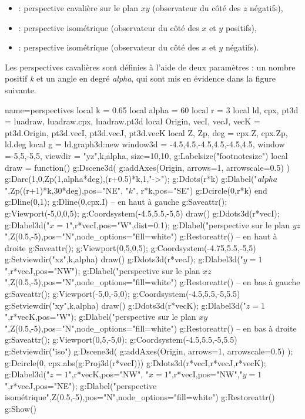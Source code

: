 \begin{itemize}
\begin{itemize}
            \item {} : perspective cavalière sur le plan $xy$ (observateur du côté des $z$ négatifs),
            \item {} : perspective isométrique (observateur du côté des $x$ et $y$ positifs),
            \item {} : perspective isométrique (observateur du côté des $x$ et $y$ négatifs).
        \end{itemize}
        Les perspectives cavalières sont définies à l'aide de deux paramètres : un nombre positif \emph{k} et un angle en degré \emph{alpha}, qui sont mis en évidence dans la figure suivante.
\end{itemize}

\begin{center}
\begin{luadraw}{name=perspectives}
local k = 0.65
local alpha = 60
local r = 3
local ld, cpx, pt3d = luadraw, luadraw.cpx, luadraw.pt3d
local Origin, vecI, vecJ, vecK = pt3d.Origin, pt3d.vecI, pt3d.vecJ, pt3d.vecK 
local Z, Zp, deg = cpx.Z, cpx.Zp, ld.deg
local g = ld.graph3d:new{
    window3d = {-4.5,4.5,-4.5,4.5,-4.5,4.5},
    window ={-5,5,-5,5},
    viewdir = {"yz",k,alpha},
    size={10,10},
}
g:Labelsize("footnotesize")
local draw = function()
    g:Dscene3d( g:addAxes(Origin, {arrows=1, arrowscale=0.5}) )
    g:Darc(1,0,Zp(1,alpha*deg),(r+0.5)*k,1,"->"); g:Ddots(r*k)
    g:Dlabel("$\\alpha$",Zp((r+1)*k,30*deg),{pos="NE"}, "$k$", r*k,{pos="SE"})
    g:Dcircle(0,r*k)
end
g:Dline(0,1); g:Dline(0,cpx.I)
-- en haut à gauche
g:Saveattr(); g:Viewport(-5,0,0,5); g:Coordsystem(-4.5,5.5,-5,5)
draw()
g:Ddots3d(r*vecI); g:Dlabel3d("$x=1$",r*vecI,{pos="W",dist=0.1}); 
g:Dlabel("perspective sur le plan $yz$",Z(0.5,-5),{pos="N",node_options="fill=white"})
g:Restoreattr()
-- en haut à droite
g:Saveattr(); g:Viewport(0,5,0,5); g:Coordsystem(-4.75,5.5,-5,5)
g:Setviewdir({"xz",k,alpha})
draw()
g:Ddots3d(r*vecJ); g:Dlabel3d("$y=1$",r*vecJ,{pos="NW"}); 
g:Dlabel("perspective sur le plan $xz$",Z(0.5,-5),{pos="N",node_options="fill=white"})
g:Restoreattr()
-- en bas à gauche
g:Saveattr(); g:Viewport(-5,0,-5,0); g:Coordsystem(-4.5,5.5,-5,5.5)
g:Setviewdir({"xy",k,alpha})
draw()
g:Ddots3d(r*vecK); g:Dlabel3d("$z=1$",r*vecK,{pos="W"}); 
g:Dlabel("perspective sur le plan $xy$",Z(0.5,-5),{pos="N",node_options="fill=white"})
g:Restoreattr()
-- en bas à droite
g:Saveattr(); g:Viewport(0,5,-5,0); g:Coordsystem(-4.5,5.5,-5,5.5)
g:Setviewdir("iso")
g:Dscene3d( g:addAxes(Origin, {arrows=1, arrowscale=0.5}) ); g:Dcircle(0, cpx.abs(g:Proj3d(r*vecI)))
g:Ddots3d({r*vecI,r*vecJ,r*vecK}); 
g:Dlabel3d("$z=1$",r*vecK,{pos="NW"}, "$x=1$",r*vecI,{pos="NW"},"$y=1$",r*vecJ,{pos="NE"});
g:Dlabel("perspective isométrique",Z(0.5,-5),{pos="N",node_options="fill=white"})
g:Restoreattr()
g:Show()
\end{luadraw}
\end{center}

